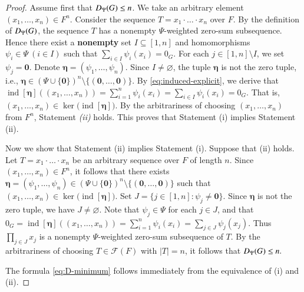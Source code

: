 \documentclass[10pt,a4paper]{amsart}
\begin{document}
\begin{proof}
Assume first that ${\rm D}_{\Psi}(G)\le n$. We take an arbitrary element
$(x_1,\ldots,x_n)\in F^n.$
Consider the sequence
$T=x_1\cdot\ldots\cdot x_n$
over $F$. By the definition of ${\rm D}_{\Psi}(G)$, the sequence $T$
has a nonempty $\Psi$-weighted zero-sum subsequence. Hence there exist
a {\bf nonempty} set $I\subseteq[1,n]$ and homomorphisms
$\psi_i\in\Psi \ (i\in I)$
such that
$\sum_{i\in I}\psi_i(x_i)=0_G.$ For each $j\in[1,n]\setminus I$, we set $\psi_j=\mathbf 0$. Denote
$\boldsymbol{\eta}=(\psi_1,\ldots,\psi_n).$
Since $I\neq\varnothing$, the tuple $\boldsymbol{\eta}$ is not the
zero tuple, i.e., $\boldsymbol{\eta}\in
   (\Psi\cup\{\mathbf 0\})^n\setminus
   \{(\mathbf 0,\ldots,\mathbf 0)\}$. By \eqref{eq:induced-explicit}, we derive that
$\operatorname{ind}[\boldsymbol{\eta}]\left((x_1,\ldots,x_n)\right)=\sum_{i=1}^n\psi_i(x_i)=\sum_{i\in I}\psi_i(x_i)=0_G.$ That is,
$(x_1,\ldots,x_n)\in
  \ker\bigl(\operatorname{ind}[\boldsymbol{\eta}]\bigr).$
By the arbitrariness of choosing $(x_1,\ldots,x_n)$ from $F^n$, Statement \emph{(ii)} holds. This proves that Statement (i) implies Statement (ii).

Now we show that Statement (ii) implies Statement (i). Suppose that (ii) holds.  Let
$T=x_1\cdot\ldots\cdot x_n$
be an arbitrary sequence over $F$ of length $n$.  Since $(x_1,\ldots,x_n)\in F^n$, it follows that there
exists
$\boldsymbol{\eta}=(\psi_1,\ldots,\psi_n)
  \in
  (\Psi\cup\{\mathbf 0\})^n
  \setminus\{(\mathbf 0,\ldots,\mathbf 0)\}$
such that
$(x_1,\ldots,x_n)
  \in
  \ker\bigl(\operatorname{ind}[\boldsymbol{\eta}]\bigr).$
Set
$J=\{j\in[1,n]:\psi_j\neq\mathbf 0\}.$
Since $\boldsymbol{\eta}$ is not the zero tuple, we have $J\neq
\varnothing$. Note that $\psi_j\in\Psi$ for each $j\in J$, and that
$0_G=\operatorname{ind}[\boldsymbol{\eta}]
      \left((x_1,\ldots,x_n)\right)=
      \sum_{i=1}^n\psi_i(x_i) =
      \sum_{j\in J}\psi_j(x_j).$
Thus
$\prod\limits_{j\in J}x_j$
is a nonempty $\Psi$-weighted zero-sum subsequence of $T$. By the arbitrariness of choosing $T\in \mathcal{F}(F)$ with $|T|=n$, it follows that
${\rm D}_{\Psi}(G)\le n.$

The formula \eqref{eq:D-minimum} follows immediately from the
equivalence of (i) and (ii).
\end{proof}
\end{document}
